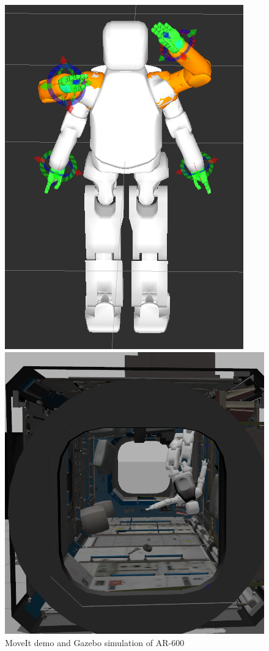 \documentclass[letterpaper, 10 pt, conference]{ieeeconf}  %
\begin{document}
\begin{figure}[thpb] 
\centering

\begin{minipage}[h]{0.35\linewidth}
\includegraphics[scale=.27]{moveit}
\end{minipage}
\hfill
\begin{minipage}[h]{0.55\linewidth}
\includegraphics[scale=.18]{gazebo}
\end{minipage}

\caption{MoveIt demo and Gazebo simulation of AR-600}
\label{img:moveitgazebo}
\end{figure}
\end{document}
